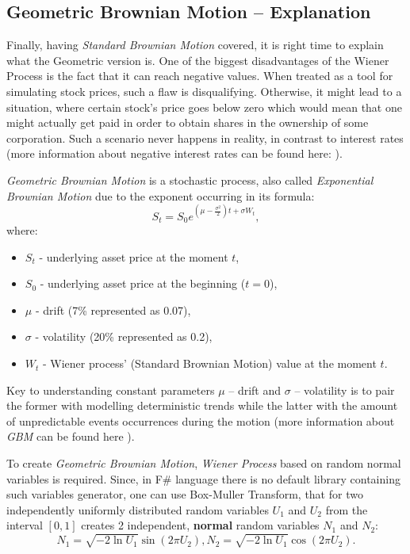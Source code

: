     \subsection{Geometric Brownian Motion -- Explanation}
        Finally, having \textit{Standard Brownian Motion} covered, it is right time to explain what the Geometric version is. One of the biggest disadvantages of the Wiener Process is the fact that it can reach negative values. When treated as a tool for simulating stock prices, such a flaw is disqualifying. Otherwise, it might lead to a situation, where certain stock's price goes below zero which would mean that one might actually get paid in order to obtain shares in the ownership of some corporation. Such a scenario never happens in reality, in contrast to interest rates (more information about negative interest rates can be found here: \cite{negativeInterestRates}).
        
        \textit{Geometric Brownian Motion} is a stochastic process, also called \textit{Exponential Brownian Motion} due to the exponent occurring in its formula:
        \[
        S_t = S_0e^{(\mu - \frac{\sigma^2}{2})t + \sigma W_t}
        ,
        \]
        where:
        \begin{itemize}
        \item $S_t$ - underlying asset price at the moment $t$,
        \item $S_0$ - underlying asset price at the beginning ($t=0$),
        \item $\mu$ - drift (7\% represented as 0.07),
        \item $\sigma$ - volatility (20\% represented as 0.2),
        \item $W_t$ - Wiener process' (Standard Brownian Motion) value at the moment $t$.
    \end{itemize}
    Key to understanding constant parameters $\mu$ -- drift and $\sigma$ -- volatility is to pair the former with modelling deterministic trends while the latter with the amount of unpredictable events occurrences during the motion (more information about \textit{GBM} can be found here \cite{gbm}).
    
    To create \textit{Geometric Brownian Motion}, \textit{Wiener Process} based on random normal variables is required. Since, in F\# language there is no default library containing such variables generator, one can use Box-Muller Transform, that for two independently uniformly distributed random variables $U_1$ and $U_2$ from the interval $[0,1]$ creates 2 independent, \textbf{normal} random variables $N_1$ and $N_2$:
    \[
    N_1 = \sqrt{-2\ln{U_1}}\sin(2\pi U_2), N_2 = \sqrt{-2\ln{U_1}}\cos(2\pi U_2)
    .
    \]
    
